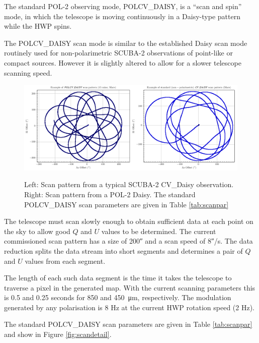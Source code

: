 The standard POL-2 observing mode, POLCV\_DAISY, is a “scan and spin” mode,
in which the telescope is moving continuously in a Daisy-type pattern while the
HWP spins.

The POLCV\_DAISY scan mode is similar to the established Daisy scan mode
routinely used for non-polarimetric SCUBA-2 observations of point-like or compact
sources. However it is slightly altered to allow for a slower telescope scanning
speed.


\begin{figure}[t!]
\begin{center}
\includegraphics[width=0.9\linewidth]{scan_pattern_daisy_comparison.png}
\label{fig:scancompsrison}
\caption [Scan Pattern Comparison]{Left: Scan pattern from a typical SCUBA-2 CV\_Daisy
observation. Right: Scan pattern from a POL-2 Daisy. The standard POLCV\_DAISY scan
parameters are given in Table \ref{tab:scanpar}
  \small
}
\end{center}
\end{figure}


The telescope must scan slowly enough to obtain sufficient data at each
point on the sky to allow good $Q$ and $U$ values to be determined. The current
commissioned scan pattern has a size of 200\si{\arcsecond} and a scan speed of
8\si{\arcsecond}/s. The data reduction splits the data stream into short
segments and determines a pair of $Q$ and $U$ values from each segment.

The length of each such data segment is the time it takes the telescope to traverse
a pixel in the generated map. With the current scanning parameters this is 0.5 and
0.25 seconds for 850 and \SI{450}{\micro\metre}, respectively. The modulation
generated by any polarisation is 8 Hz at the current HWP rotation speed
(2 Hz).

The standard POLCV\_DAISY scan parameters are given in Table \ref{tab:scanpar} and show in Figure \ref{fig:scandetail}.

